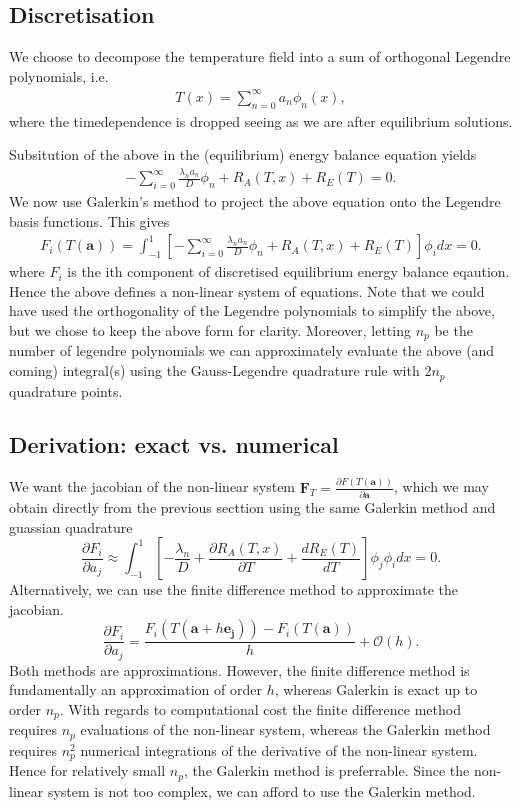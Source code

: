 \subsection{Discretisation}
We choose to decompose the temperature field into a sum of orthogonal Legendre polynomials, i.e.
\begin{align*}
    T(x) = \sum_{n=0}^{\infty} a_n \phi_n(x),
\end{align*}
where the timedependence is dropped seeing as we are after equilibrium solutions.

Subsitution of the above in the (equilibrium) energy balance equation yields
\begin{align*}
    -\sum_{i=0}^{\infty} \frac{\lambda_n a_n}{D} \phi_n + R_A(T,x) + R_E(T) = 0.
\end{align*}
We now use Galerkin's method to project the above equation onto the Legendre basis functions. This gives
\begin{align*}
    F_i(T(\mathbf{a})) = \int_{-1}^{1} \left[-\sum_{i=0}^{\infty} \frac{\lambda_n a_n}{D}\phi_n + R_A(T,x) + R_E(T)\right] \phi_i dx = 0.
\end{align*}
where $F_i$ is the ith component of discretised equilibrium energy balance eqaution. Hence the above defines
a non-linear system of equations. Note that we could have used the orthogonality of the Legendre polynomials to
simplify the above, but we chose to keep the above form for clarity. Moreover, letting $n_p$ be the number
of legendre polynomials we can approximately evaluate the above (and coming) integral(s) using the Gauss-Legendre 
quadrature rule with $2n_p$ quadrature points.

\subsection{Derivation: exact vs. numerical}
We want the jacobian of the non-linear system $\mathbf{F}_T = \frac{\partial F(T(\mathbf{a}))}{\partial \mathbf{a}}$, which we may
obtain directly from the previous secttion using the same Galerkin method and guassian quadrature
\begin{equation}
    \frac{\partial F_i}{\partial a_j} \approx \int_{-1}^{1} \left[-\frac{\lambda_n}{D} +  \frac{\partial R_A(T,x)}{\partial T} + \frac{d R_E(T)}{d T}\right]\phi_j \phi_i dx = 0.
\label{eq:exact_jac}
\end{equation}
Alternatively, we can use the finite difference method to approximate the jacobian.
\begin{equation}
    \frac{\partial F_i}{\partial a_j} = \frac{F_i(T(\mathbf{a} + h \mathbf{e_j})) - F_i(T(\mathbf{a}))}{h} + \mathcal{O}(h).
\label{eq:fd_jac}
\end{equation}
Both methods are approximations. However, the finite difference method is fundamentally an approximation of order $h$, whereas 
Galerkin is exact up to order $n_p$. With regards to computational cost the finite difference method requires $n_p$ evaluations of the
non-linear system, whereas the Galerkin method requires $n_p^2$ numerical integrations of the derivative of the non-linear system. Hence 
for relatively small $n_p$, the Galerkin method is preferrable. Since the non-linear system is not too complex, 
we can afford to use the Galerkin method.

